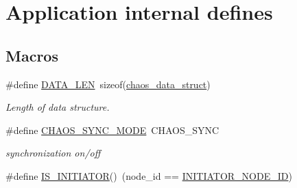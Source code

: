 \hypertarget{group__chaos-test-defines}{\section{Application internal defines}
\label{group__chaos-test-defines}
}
\subsection*{Macros}
\begin{DoxyCompactItemize}
\item 
\hypertarget{group__chaos-test-defines_gaf02e45f15080b8ec9dd7b286157617ff}{\#define \hyperlink{group__chaos-test-defines_gaf02e45f15080b8ec9dd7b286157617ff}{D\-A\-T\-A\-\_\-\-L\-E\-N}~sizeof(\hyperlink{structchaos__data__struct}{chaos\-\_\-data\-\_\-struct})}\label{group__chaos-test-defines_gaf02e45f15080b8ec9dd7b286157617ff}

\begin{DoxyCompactList}\small\item\em Length of data structure. \end{DoxyCompactList}\item 
\hypertarget{group__chaos-test-defines_ga4033ccadc530529ac8bc59d83d36b727}{\#define \hyperlink{group__chaos-test-defines_ga4033ccadc530529ac8bc59d83d36b727}{C\-H\-A\-O\-S\-\_\-\-S\-Y\-N\-C\-\_\-\-M\-O\-D\-E}~C\-H\-A\-O\-S\-\_\-\-S\-Y\-N\-C}\label{group__chaos-test-defines_ga4033ccadc530529ac8bc59d83d36b727}

\begin{DoxyCompactList}\small\item\em synchronization on/off \end{DoxyCompactList}\item 
\hypertarget{group__chaos-test-defines_ga3d1e7d432a1b08c6c103a999b1dc76df}{\#define \hyperlink{group__chaos-test-defines_ga3d1e7d432a1b08c6c103a999b1dc76df}{I\-S\-\_\-\-I\-N\-I\-T\-I\-A\-T\-O\-R}()~(node\-\_\-id == \hyperlink{group__chaos-test-settings_ga2e373237aef3ee2b0fdb15cd0b8c5390}{I\-N\-I\-T\-I\-A\-T\-O\-R\-\_\-\-N\-O\-D\-E\-\_\-\-I\-D})}\label{group__chaos-test-defines_ga3d1e7d432a1b08c6c103a999b1dc76df}


\end{DoxyCompactItemize}
